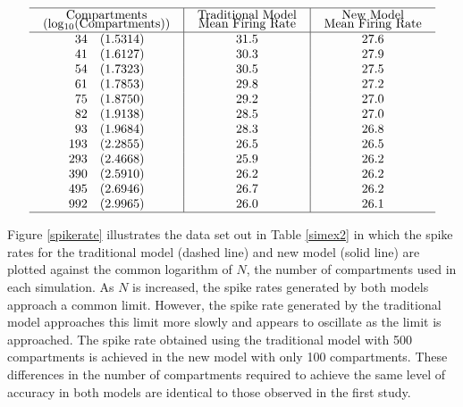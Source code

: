 \begin{table}[!h]
\[
\begin{array}{c|c|c}
\hline
\mbox{\begin{tabular}{c}
Compartments \\[-5pt] (log$_{10}(\mbox{Compartments}))$
\end{tabular}} &
\mbox{\begin{tabular}{c}
Traditional Model \\[-5pt] Mean Firing Rate
\end{tabular}}
&\mbox{\begin{tabular}{c}
New Model \\[-5pt] Mean Firing Rate \end{tabular}}\\
\hline
\phantom{0}34 \quad (1.5314) & 31.5 & 27.6 \\
\phantom{0}41 \quad (1.6127) & 30.3 & 27.9 \\
\phantom{0}54 \quad (1.7323) & 30.5 & 27.5 \\
\phantom{0}61 \quad (1.7853) & 29.8 & 27.2 \\
\phantom{0}75 \quad (1.8750) & 29.2 & 27.0 \\
\phantom{0}82 \quad (1.9138) & 28.5 & 27.0 \\
\phantom{0}93 \quad (1.9684) & 28.3 & 26.8 \\
          193 \quad (2.2855) & 26.5 & 26.5 \\
          293 \quad (2.4668) & 25.9 & 26.2 \\
          390 \quad (2.5910) & 26.2 & 26.2 \\
          495 \quad (2.6946) & 26.7 & 26.2 \\
          992 \quad (2.9965) & 26.0 & 26.1 \\
\hline
\end{array}
\]
\centering
\parbox{5in}{\caption{\label{simex2} The spike rate estimated from
a 10 second record of spike train activity obtained from a
traditional and the new compartmental model at 12 different levels
of spatial discretisation (number of compartments).}}
\end{table}

Figure \ref{spikerate} illustrates the data set out in Table
\ref{simex2} in which the spike rates for the traditional model
(dashed line) and new model (solid line) are plotted against the
common logarithm of $N$, the number of compartments used in each
simulation. As $N$ is increased, the spike rates generated by both
models approach a common limit. However, the spike rate generated
by the traditional model approaches this limit more slowly and
appears to oscillate as the limit is approached. The spike rate
obtained using the traditional model with 500 compartments is
achieved in the new model with only 100 compartments. These
differences in the number of compartments required to achieve the
same level of accuracy in both models are identical to those
observed in the first study.

